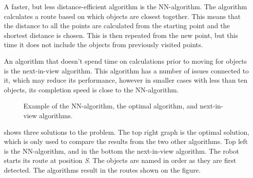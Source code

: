 A faster, but less distance-efficient algorithm is the NN-algorithm. The algorithm calculates a route based on which objects are closest together. This means that the distance to all the points are calculated from the starting point and the shortest distance is chosen. This is then repeated from the new point, but this time it does not include the objects from previously visited points.

An algorithm that doesn't spend time on calculations prior to moving for objects is the next-in-view algorithm. This algorithm has a number of issues connected to it, which may reduce its performance, however in smaller cases with less than ten objects, its completion speed is close to the NN-algorithm.

\begin{figure}[H]
     \caption{\label{fig:algorithm-example} Example of the NN-algorithm, the optimal algorithm, and next-in-view algorithms.}
\end{figure}

 shows three solutions to the problem. The top right graph is the optimal solution, which is only used to compare the results from the two other algorithms. Top left is the NN-algorithm, and in the bottom the next-in-view algorithm. The robot starts its route at position \emph{S}. The objects are named in order as they are first detected. The algorithms result in the routes shown on the figure.

